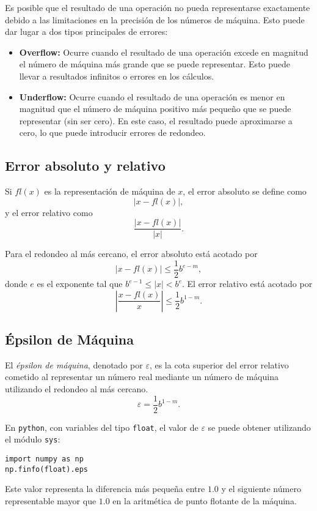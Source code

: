 \documentclass[12pt]{article}
\begin{document}
Es posible que el resultado de una operación no pueda representarse exactamente debido a las limitaciones en la precisión de los números de máquina. Esto puede dar lugar a dos tipos principales de errores:

\begin{itemize}
    \item \textbf{Overflow:} Ocurre cuando el resultado de una operación excede en magnitud el número de máquina más grande que se puede representar. Esto puede llevar a resultados infinitos o errores en los cálculos.
    \item \textbf{Underflow:} Ocurre cuando el resultado de una operación es menor en magnitud que el número de máquina positivo más pequeño que se puede representar (sin ser cero). En este caso, el resultado puede aproximarse a cero, lo que puede introducir errores de redondeo.
\end{itemize}

\subsection{Error absoluto y relativo}

\begin{definition}
    Si $fl(x)$ es la representación de máquina de $x$, el error absoluto se define como 
    $$|x - fl(x)|,$$
    y el error relativo como 
    $$\frac{|x - fl(x)|}{|x|}.$$
\end{definition}

Para el redondeo al más cercano, el error absoluto está acotado por
$$|x - fl(x)| \leq \frac{1}{2} b^{e-m},$$ donde $e$ es el exponente tal que $b^{e-1} \le |x| < b^e$. El error relativo está acotado por
$$
    \left| \frac{x - fl(x)}{x} \right| \le \frac{1}{2} b^{1-m}.
$$

\subsection{Épsilon de Máquina}

\begin{definition}
    El \emph{épsilon de máquina}, denotado por $\varepsilon$, es la cota superior del error relativo cometido al representar un número real mediante un número de máquina utilizando el redondeo al más cercano.
    $$
        \varepsilon = \frac{1}{2} b^{1-m}.
    $$
\end{definition}

\begin{remark}
    En \texttt{python}, con variables del tipo \texttt{float}, el valor de $\varepsilon$ se puede obtener utilizando el módulo \texttt{sys}:
    \begin{lstlisting}[language=iPython]
import numpy as np
np.finfo(float).eps\end{lstlisting}
    Este valor representa la diferencia más pequeña entre $1.0$ y el siguiente número representable mayor que $1.0$ en la aritmética de punto flotante de la máquina.
\end{remark}
\end{document}
